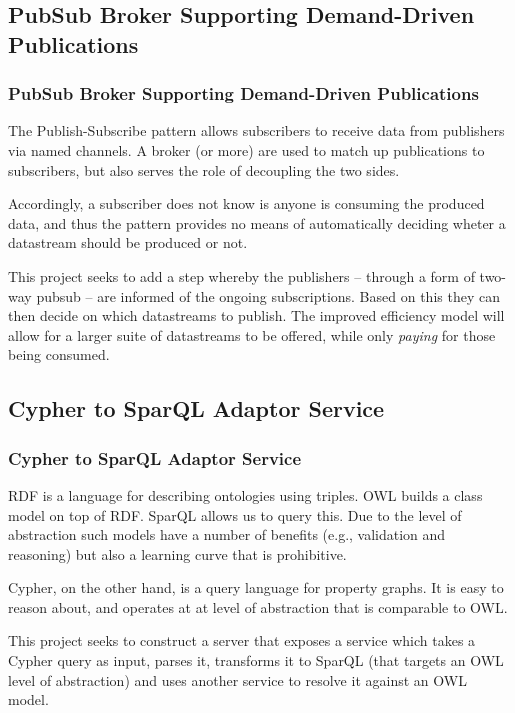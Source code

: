 \subsection{PubSub Broker Supporting Demand-Driven Publications}
\begin{frame}
    \frametitle{PubSub Broker Supporting Demand-Driven Publications}
    \vspace{0mm}
    The Publish-Subscribe pattern allows subscribers to receive data from publishers via named channels. A broker (or more) are used to match up publications to subscribers, but also serves the role of decoupling the two sides.
    
    \vspace{3mm}
    Accordingly, a subscriber does not know is anyone is consuming the produced data, and thus the pattern provides no means of automatically deciding wheter a datastream should be produced or not.
    
    \vspace{3mm}
    This project seeks to add a step whereby the publishers -- through a form of two-way pubsub -- are informed of the ongoing subscriptions. Based on this they can then decide on which datastreams to publish. The improved efficiency model will allow for a larger suite of datastreams to be offered, while only \textsl{paying} for those being consumed.

\end{frame}

\subsection{Cypher to SparQL Adaptor Service}
\begin{frame}
    \frametitle{Cypher to SparQL Adaptor Service}
    \vspace{0mm}
    RDF is a language for describing ontologies using triples. OWL builds a class model on top of RDF. SparQL allows us to query this. Due to the level of abstraction such models have a number of benefits (e.g., validation and reasoning) but also a learning curve that is prohibitive.
    
    \vspace{3mm}
    Cypher, on the other hand, is a query language for property graphs. It is easy to reason about, and operates at at level of abstraction that is comparable to OWL.
    
    \vspace{3mm}
    This project seeks to construct a server that exposes a service which takes a Cypher query as input, parses it, transforms it to SparQL (that targets an OWL level of abstraction) and uses another service to resolve it against an OWL model.
\end{frame}

